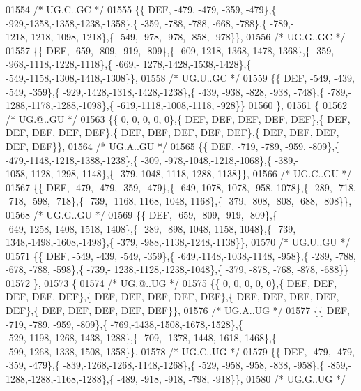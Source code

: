 \begin{DoxyCode}
01554 \textcolor{comment}{/* UG.C..GC */}
01555 \{\{  DEF, -479, -479, -359, -479\},\{ -929,-1358,-1358,-1238,-1358\},\{ -359, -788, -788, -668, -788\},\{ -789,-
      1218,-1218,-1098,-1218\},\{ -549, -978, -978, -858, -978\}\},
01556 \textcolor{comment}{/* UG.G..GC */}
01557 \{\{  DEF, -659, -809, -919, -809\},\{ -609,-1218,-1368,-1478,-1368\},\{ -359, -968,-1118,-1228,-1118\},\{ -669,-
      1278,-1428,-1538,-1428\},\{ -549,-1158,-1308,-1418,-1308\}\},
01558 \textcolor{comment}{/* UG.U..GC */}
01559 \{\{  DEF, -549, -439, -549, -359\},\{ -929,-1428,-1318,-1428,-1238\},\{ -439, -938, -828, -938, -748\},\{ -789,-
      1288,-1178,-1288,-1098\},\{ -619,-1118,-1008,-1118, -928\}\}
01560 \},
01561 \{
01562 \textcolor{comment}{/* UG.@..GU */}
01563 \{\{    0,    0,    0,    0,    0\},\{  DEF,  DEF,  DEF,  DEF,  DEF\},\{  DEF,  DEF,  DEF,  DEF,  DEF\},\{  DEF,  
      DEF,  DEF,  DEF,  DEF\},\{  DEF,  DEF,  DEF,  DEF,  DEF\}\},
01564 \textcolor{comment}{/* UG.A..GU */}
01565 \{\{  DEF, -719, -789, -959, -809\},\{ -479,-1148,-1218,-1388,-1238\},\{ -309, -978,-1048,-1218,-1068\},\{ -389,-
      1058,-1128,-1298,-1148\},\{ -379,-1048,-1118,-1288,-1138\}\},
01566 \textcolor{comment}{/* UG.C..GU */}
01567 \{\{  DEF, -479, -479, -359, -479\},\{ -649,-1078,-1078, -958,-1078\},\{ -289, -718, -718, -598, -718\},\{ -739,-
      1168,-1168,-1048,-1168\},\{ -379, -808, -808, -688, -808\}\},
01568 \textcolor{comment}{/* UG.G..GU */}
01569 \{\{  DEF, -659, -809, -919, -809\},\{ -649,-1258,-1408,-1518,-1408\},\{ -289, -898,-1048,-1158,-1048\},\{ -739,-
      1348,-1498,-1608,-1498\},\{ -379, -988,-1138,-1248,-1138\}\},
01570 \textcolor{comment}{/* UG.U..GU */}
01571 \{\{  DEF, -549, -439, -549, -359\},\{ -649,-1148,-1038,-1148, -958\},\{ -289, -788, -678, -788, -598\},\{ -739,-
      1238,-1128,-1238,-1048\},\{ -379, -878, -768, -878, -688\}\}
01572 \},
01573 \{
01574 \textcolor{comment}{/* UG.@..UG */}
01575 \{\{    0,    0,    0,    0,    0\},\{  DEF,  DEF,  DEF,  DEF,  DEF\},\{  DEF,  DEF,  DEF,  DEF,  DEF\},\{  DEF,  
      DEF,  DEF,  DEF,  DEF\},\{  DEF,  DEF,  DEF,  DEF,  DEF\}\},
01576 \textcolor{comment}{/* UG.A..UG */}
01577 \{\{  DEF, -719, -789, -959, -809\},\{ -769,-1438,-1508,-1678,-1528\},\{ -529,-1198,-1268,-1438,-1288\},\{ -709,-
      1378,-1448,-1618,-1468\},\{ -599,-1268,-1338,-1508,-1358\}\},
01578 \textcolor{comment}{/* UG.C..UG */}
01579 \{\{  DEF, -479, -479, -359, -479\},\{ -839,-1268,-1268,-1148,-1268\},\{ -529, -958, -958, -838, -958\},\{ -859,-
      1288,-1288,-1168,-1288\},\{ -489, -918, -918, -798, -918\}\},
01580 \textcolor{comment}{/* UG.G..UG */}

\end{DoxyCode}

